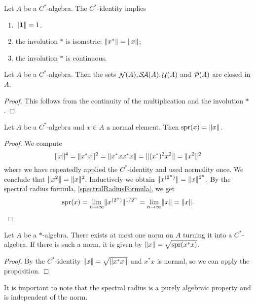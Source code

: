 \begin{lemma} \label{consequencesC*}
Let $A$ be a $C^*$-algebra. The $C^*$-identity implies
\begin{enumerate}
\item  $\lVert\boldsymbol{\mathrm{1}}\rVert = 1$.
\item the involution $*$ is isometric: $\lVert x^*\rVert = \lVert x\rVert$;
\item the involution $*$ is continuous.
\end{enumerate}
\end{lemma}

\begin{lemma}
Let $A$ be a $C^*$-algebra. Then the sets $\mathop{\mathcal{N}}\nolimits(A), \mathop{\mathcal{S}\hspace{-0.15em}\mathcal{A}}\nolimits(A), \mathop{\mathcal{U}}\nolimits(A)$ and $\mathop{\mathcal{P}}\nolimits(A)$ are closed in $A$. 
\end{lemma}
\begin{proof}
This follows from the continuity of the multiplication and the involution $*$.
\end{proof}

\begin{proposition} \label{normNormalElement}
Let $A$ be a $C^*$-algebra and $x\in A$ a normal element. Then $\operatorname{spr}(x) = \lVert x\rVert$.
\end{proposition}
\begin{proof}
We compute
\[ \lVert x\rVert^4 = \lVert x^*x\rVert^2 = \lVert x^*xx^*x\rVert = \lVert(x^*)^2x^2\rVert = \lVert x^2\rVert^2 \]
where we have repeatedly applied the $C^*$-identity and used normality once. We conclude that $\lVert x^2\rVert = \lVert x\rVert^2$. Inductively we obtain $\lVert x^{(2^n)}\rVert = \lVert x\rVert^{2^n}$. By the spectral radius formula, \ref{spectralRadiusFormula}, we get
\[ \operatorname{spr}(x) = \lim_{n\to\infty}\lVert x^{(2^n)}\rVert^{1/2^n} = \lim_{n\to\infty}\lVert x\rVert = \lVert x\rVert. \]
\end{proof}
\begin{corollary} \label{atMostOneNorm}
Let $A$ be a $*$-algebra. There exists at most one norm on $A$ turning it into a $C^*$-algebra. If there is such a norm, it is given by $\lVert x\rVert = \sqrt{\operatorname{spr}(x^*x)}$.
\end{corollary}
\begin{proof}
By the $C^*$-identity $\lVert x\rVert = \sqrt{\lVert x^*x\rVert}$ and $x^*x$ is normal, so we can apply the proposition.
\end{proof}
It is important to note that the spectral radius is a purely algebraic property and is independent of the norm.

